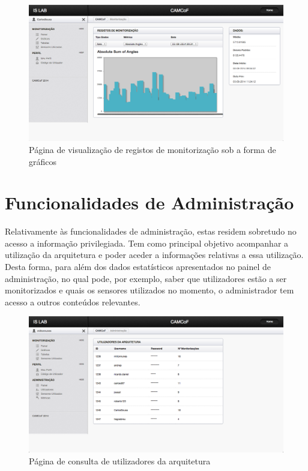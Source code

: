  \begin{figure}[htb]
   \centering
   \includegraphics[scale=0.29]{Images/graphs1.png}
   \caption{Página de visualização de registos de monitorização sob a forma de gráficos}
\end{figure}


\section{Funcionalidades de Administração}

Relativamente às funcionalidades de administração, estas residem sobretudo no acesso a informação privilegiada. Tem como principal objetivo acompanhar a utilização da arquitetura e poder aceder a informações relativas a essa utilização. Desta forma, para além dos dados estatísticos apresentados no painel de administração, no qual pode, por exemplo, saber que utilizadores estão a ser monitorizados e quais os sensores utilizados no momento, o administrador tem acesso a outros conteúdos relevantes.

\begin{figure}[htb]
   \centering
   \includegraphics[scale=0.29]{Images/users1.png}
   \caption{Página de consulta de utilizadores da arquitetura}
\end{figure}

